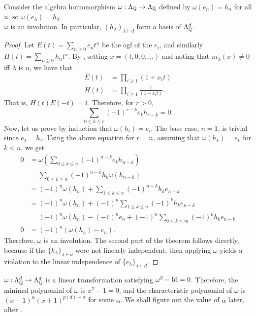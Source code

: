 	\begin{ftheo}
		\label{theo: h basis}
		Consider the algebra homomorphism $\omega : \Lambda_{\mathbb{Q}} \to \Lambda_{\mathbb{Q}}$ defined by $\omega(e_n) = h_n$ for all $n$, so $\omega(e_\lambda) = h_\lambda$.\\
		$\omega$ is an involution. In particular, $(h_\lambda)_{\lambda \vdash d}$ form a basis of $\Lambda_{\mathbb{Q}}^d$.
	\end{ftheo}
	\begin{proof}
		Let $E(t) = \sum_{n \ge 0} e_n t^n$ be the ogf of the $e_i$, and similarly $H(t) = \sum_{n \ge 0} h_n t^n$. By , setting $x = (t,0,0,\ldots)$ and noting that $m_\lambda(x) \ne 0$ iff $\lambda$ is $n$, we have that
		\begin{align*}
			E(t) &= \prod_{i \ge 1} (1+x_it) \\
			H(t) &= \prod_{i \ge 1} \frac{1}{(1-x_it)}.
		\end{align*}
		That is, $H(t) E(-t) = 1$. Therefore, for $r > 0$,
		\[ \sum_{0 \le k \le r} (-1)^{r-k} e_k h_{r-k} = 0. \]
		Now, let us prove by induction that $\omega(h_i) = e_i$. The base case, $n = 1$, is trivial since $e_1 = h_1$. Using the above equation for $r = n$, assuming that $\omega(h_k) = e_k$ for $k < n$, we get
		\begin{align*}
			0 &= \omega\left(\sum_{0 \le k \le n} (-1)^{n-k} e_k h_{n-k}\right) \\
				&= \sum_{0 \le k \le n} (-1)^{n-k} h_k \omega(h_{n-k}) \\
				&= (-1)^{n}\omega(h_n) + \sum_{1 \le k \le n} (-1)^{n-k} h_k e_{n-k} \\
				&= (-1)^{n}\omega(h_n) + (-1)^n \sum_{1 \le k \le n} (-1)^{k} h_k e_{n-k} \\
				&= (-1)^n \omega(h_n) - (-1)^n e_n + (-1)^n \sum_{0 \le k \le m} (-1)^k h_k e_{n-k} \\
			0 &= (-1)^n (\omega(h_n) - e_n).
		\end{align*}
		Therefore, $\omega$ is an involution. The second part of the theorem follows directly, because if the $\{h_\lambda\}_{\lambda \vdash d}$ were not linearly independent, then applying $\omega$ yields a violation to the linear independence of $\{e_\lambda\}_{\lambda \vdash d}$.
	\end{proof}

	\begin{remark}
		$\omega : \Lambda_{\mathbb{Q}}^d \to \Lambda_{\mathbb{Q}}^d$ is a linear transformation satisfying $\omega^2 - \operatorname{Id} = 0$. Therefore, the minimal polynomial of $\omega$ is $x^2 - 1 = 0$, and the characteristic polynomial of $\omega$ is $(x-1)^\alpha (x+1)^{p(d) - \alpha}$ for some $\alpha$. We shall figure out the value of $\alpha$ later, after .
	\end{remark}

